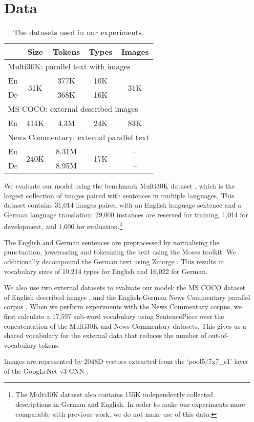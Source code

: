 \section{Data}\label{sec:data}

\begin{table}
\renewcommand{\arraystretch}{1.3}
\centering
\begin{tabular}{ccccc}
\toprule
& Size & Tokens & Types & Images\\
\midrule
\multicolumn{5}{l}{Multi30K: parallel text with images}\\
En & \multirow{2}{*}{31K} & 377K & 10K & \multirow{2}{*}{31K}\\
De & & 368K & 16K & \\
\midrule
\multicolumn{5}{l}{MS COCO: external described images}\\
En    & 414K & 4.3M & 24K & 83K \\
\midrule
\multicolumn{5}{l}{News Commentary: external parallel text}\\
En   & \multirow{2}{*}{240K} & 8.31M & \multirow{2}{*}{17K} &  --\\
De   & & 8.95M & & --\\
\bottomrule
\end{tabular}
\caption{The datasets used in our experiments.}\label{tab:datasets}
\end{table}

We evaluate our model using the benchmark Multi30K dataset \cite{ElliottFrankSimaanSpecia2016}, which is the largest collection of images paired with sentences in multiple languages. This dataset contains 31,014 images paired with an English language sentence and a German language translation: 29,000 instances are reserved for training, 1,014 for development, and 1,000 for evaluation.\footnote{The Multi30K dataset also contains 155K independently collected descriptions in German and English. In order to make our experiments more comparable with previous work, we do not make use of this data.}

The English and German sentences are preprocessed by normalising the punctuation, lowercasing and tokenizing the text using the Moses toolkit. We additionally decompound the German text  using Zmorge \cite{Sennrich2014}. This results in vocabulary sizes of 10,214 types for English and 16,022 for German.

We also use two external datasets to evaluate our model: the MS COCO dataset of English described images \cite{Chen2015}, and the English-German News Commentary parallel corpus \cite{Tiedemann2012}. When we perform experiments with the News Commentary corpus, we first calculate a 17,597 sub-word vocabulary using SentencePiece \cite{Schuster2012} over the concatentation of the Multi30K and News Commentary datasets. This gives us a shared vocabulary for the external data that reduces the number of out-of-vocabulary tokens. 

Images are represented by 2048D vectors extracted from the `pool5/7x7\_s1' layer of the GoogLeNet v3 CNN \cite{Szegedy2015}.